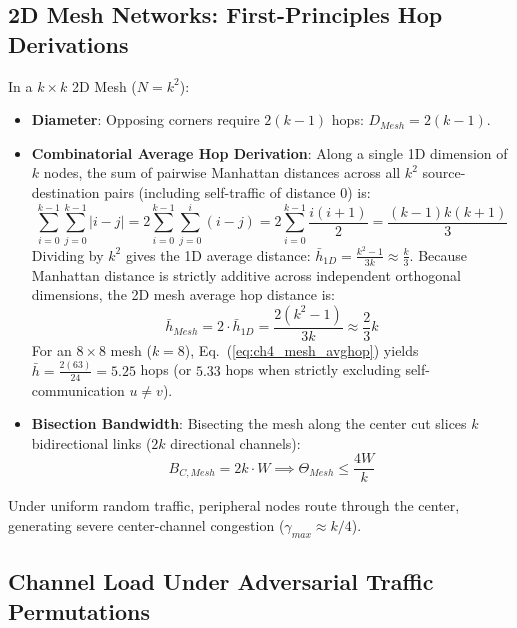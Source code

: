 \subsection{2D Mesh Networks: First-Principles Hop Derivations}
In a $k \times k$ 2D Mesh ($N = k^2$):
\begin{itemize}
    \item \textbf{Diameter}: Opposing corners require $2(k - 1)$ hops: $D_{Mesh} = 2(k - 1)$.
    \item \textbf{Combinatorial Average Hop Derivation}: Along a single 1D dimension of $k$ nodes, the sum of pairwise Manhattan distances across all $k^2$ source-destination pairs (including self-traffic of distance 0) is:
    \begin{equation}
    \sum_{i=0}^{k-1} \sum_{j=0}^{k-1} |i - j| = 2 \sum_{i=0}^{k-1} \sum_{j=0}^{i} (i - j) = 2 \sum_{i=0}^{k-1} \frac{i(i+1)}{2} = \frac{(k-1)k(k+1)}{3}
    \end{equation}
    Dividing by $k^2$ gives the 1D average distance: $\bar{h}_{1D} = \frac{k^2 - 1}{3k} \approx \frac{k}{3}$.
    Because Manhattan distance is strictly additive across independent orthogonal dimensions, the 2D mesh average hop distance is:
    \begin{equation}
    \bar{h}_{Mesh} = 2 \cdot \bar{h}_{1D} = \frac{2(k^2 - 1)}{3k} \approx \frac{2}{3} k
    \label{eq:ch4_mesh_avghop}
    \end{equation}
    For an $8 \times 8$ mesh ($k = 8$), Eq.~(\ref{eq:ch4_mesh_avghop}) yields $\bar{h} = \frac{2(63)}{24} = 5.25$ hops (or $5.33$ hops when strictly excluding self-communication $u \ne v$).
    \item \textbf{Bisection Bandwidth}: Bisecting the mesh along the center cut slices $k$ bidirectional links ($2k$ directional channels):
    \begin{equation}
    B_{C, Mesh} = 2k \cdot W \implies \Theta_{Mesh} \le \frac{4 W}{k}
    \label{eq:ch4_mesh_bisect}
    \end{equation}
\end{itemize}
Under uniform random traffic, peripheral nodes route through the center, generating severe center-channel congestion ($\gamma_{max} \approx k/4$).

\subsection{Channel Load Under Adversarial Traffic Permutations}
\label{subsec:ch4_channel_load}

